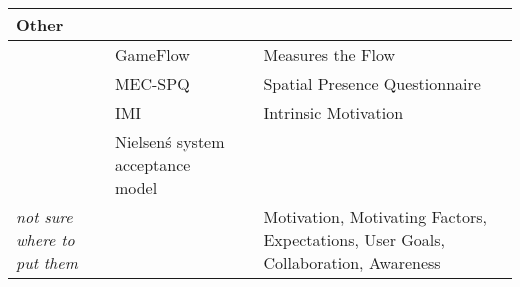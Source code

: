 \begin{tabular}{p{3cm}p{4.5cm}cp{6cm}c}
\textbf{Other} &  &  &  &    \\ \hline

& GameFlow &  & Measures the Flow & \cite{Huang2004}  \\
& MEC-SPQ &  & Spatial Presence Questionnaire & \cite{Huang2004, jacucci2010worldsofinformation}   \\
& IMI & \cite{choi1996effect, mcauley1989psychometric} & Intrinsic Motivation & \cite{Huang2004, jacucci2010worldsofinformation}  \\
& Nielsen\'s system acceptance model & &  & \cite{ojala2010ubi}  \\

\textit{not sure where to put them} &  &  & Motivation, Motivating Factors, Expectations, User Goals, Collaboration, Awareness
 &    \\ \hline

\bottomrule
\end{tabular}
